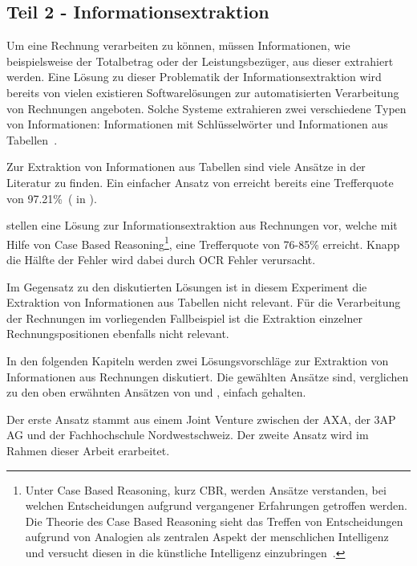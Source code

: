 \subsection{Teil 2 - Informationsextraktion}
\label{chap:ie}



Um eine Rechnung verarbeiten zu können, müssen Informationen, wie beispielsweise der Totalbetrag oder der Leistungsbezüger, aus dieser extrahiert werden. Eine Lösung zu dieser Problematik der Informationsextraktion wird bereits von vielen existieren Softwarelösungen zur automatisierten Verarbeitung von Rechnungen angeboten. Solche Systeme extrahieren zwei verschiedene Typen von Informationen: Informationen mit Schlüsselwörter und Informationen aus Tabellen~\autocite{Hamza}.

Zur Extraktion von Informationen aus Tabellen sind viele Ansätze in der Literatur zu finden. Ein einfacher Ansatz von \textcite{Mandal} erreicht bereits eine Trefferquote von 97.21\%~(\cite{Mandal} in \cite{Hamza}).

\textcite{Hamza} stellen eine Lösung zur Informationsextraktion aus Rechnungen vor, welche mit Hilfe von Case Based Reasoning\footnote{Unter Case Based Reasoning, kurz CBR, werden Ansätze verstanden, bei welchen Entscheidungen aufgrund vergangener Erfahrungen getroffen werden. Die Theorie des Case Based Reasoning sieht das Treffen von Entscheidungen aufgrund von Analogien als zentralen Aspekt der menschlichen Intelligenz und versucht diesen in die künstliche Intelligenz einzubringen~\autocite{CBR}.}, eine Trefferquote von 76-85\% erreicht. Knapp die Hälfte der Fehler wird dabei durch OCR Fehler verursacht.

Im Gegensatz zu den diskutierten Lösungen ist in diesem Experiment die Extraktion von Informationen aus Tabellen nicht relevant. Für die Verarbeitung der Rechnungen im vorliegenden Fallbeispiel ist die Extraktion einzelner Rechnungspositionen ebenfalls nicht relevant.

In den folgenden Kapiteln werden zwei Lösungsvorschläge zur Extraktion von Informationen aus Rechnungen diskutiert. Die gewählten Ansätze sind, verglichen zu den oben erwähnten Ansätzen von \textcite{Mandal} und \textcite{Hamza}, einfach gehalten. 

Der erste Ansatz stammt aus einem Joint Venture zwischen der AXA, der 3AP AG und der Fachhochschule Nordwestschweiz. Der zweite Ansatz wird im Rahmen dieser Arbeit erarbeitet.

